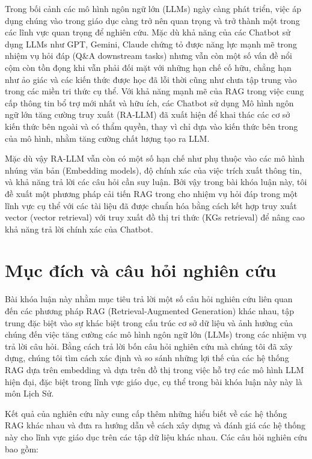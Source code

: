 Trong bối cảnh các mô hình ngôn ngữ lớn (LLMs) ngày càng phát triển, việc áp dụng chúng vào trong giáo dục càng trở nên quan trọng và trở thành một trong các lĩnh vực quan trọng để nghiên cứu. Mặc dù khả năng của các Chatbot sử dụng LLMs như GPT, Gemini, Claude chứng tỏ được năng lực mạnh mẽ trong nhiệm vụ hỏi đáp (Q\&A downstream tasks) nhưng vẫn còn một số vấn đề nổi cộm còn tồn đọng khi vẫn phải đối mặt với những hạn chế cố hữu, chẳng hạn như ảo giác và các kiến thức được học đã lỗi thời cũng như chưa tập trung vào trong các miền tri thức cụ thể. Với khả năng mạnh mẽ của RAG trong việc cung cấp thông tin bổ trợ mới nhất và hữu ích, các Chatbot sử dụng Mô hình ngôn ngữ lớn tăng cường truy xuất (RA-LLM) đã xuất hiện để khai thác các cơ sở kiến thức bên ngoài và có thẩm quyền, thay vì chỉ dựa vào kiến thức bên trong của mô hình, nhằm tăng cường chất lượng tạo ra LLM.

Mặc dù vậy RA-LLM vẫn còn có một số hạn chế như phụ thuộc vào các mô hình nhúng văn bản (Embedding models), độ chính xác của việc trích xuất thông tin, và khả năng trả lời các câu hỏi cần suy luận. Bởi vậy trong bài khóa luận này, tôi đề xuất một phương pháp cải tiến RAG trong cho nhiệm vụ hỏi đáp trong một lĩnh vực cụ thể với các tài liệu đã được chuẩn hóa bằng cách kết hợp truy xuất vector (vector retrieval) với truy xuất đồ thị tri thức (KGs retrieval) để nâng cao khả năng trả lời chính xác của Chatbot.

\section{Mục đích và câu hỏi nghiên cứu}
Bài khóa luận này nhằm mục tiêu trả lời một số câu hỏi nghiên cứu liên quan đến các phương pháp RAG (Retrieval-Augmented Generation) khác nhau, tập trung đặc biệt vào sự khác biệt trong cấu trúc cơ sở dữ liệu và ảnh hưởng của chúng đến việc tăng cường các mô hình ngôn ngữ lớn (LLMs) trong các nhiệm vụ trả lời câu hỏi. Bằng cách trả lời bốn câu hỏi nghiên cứu mà chúng tôi đã xây dựng, chúng tôi tìm cách xác định và so sánh những lợi thế của các hệ thống RAG dựa trên embedding và dựa trên đồ thị trong việc hỗ trợ các mô hình LLM hiện đại, đặc biệt trong lĩnh vực giáo dục, cụ thể trong bài khóa luận này này là môn Lịch Sử.

Kết quả của nghiên cứu này cung cấp thêm những hiểu biết về các hệ thống RAG khác nhau và đưa ra hướng dẫn về cách xây dựng và đánh giá các hệ thống này cho lĩnh vực giáo dục trên các tập dữ liệu khác nhau. Các câu hỏi nghiên cứu bao gồm:

